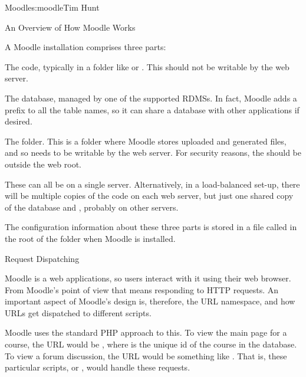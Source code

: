 \begin{aosachapter}{Moodle}{s:moodle}{Tim Hunt}
\begin{aosasect1}{An Overview of How Moodle Works}

A Moodle installation comprises three parts:

\begin{aosaenumerate}

\item The code, typically in a folder like  or
  . This should not be writable
  by the web server.

\item The database, managed by one of the supported RDMSs. In fact,
  Moodle adds a prefix to all the table names, so it can share a
  database with other applications if desired.

\item The  folder. This is a folder where Moodle
  stores uploaded and generated files, and so needs to be writable by
  the web server. For security reasons, the should be outside the web
  root.

\end{aosaenumerate}

These can all be on a single server. Alternatively, in a load-balanced
set-up, there will be multiple copies of the code on each web server,
but just one shared copy of the database and , probably on
other servers.

The configuration information about these three parts is stored in a
file called  in the root of the  folder when
Moodle is installed.

\begin{aosasect2}{Request Dispatching}

Moodle is a web applications, so users interact with it using their
web browser. From Moodle's point of view that means responding to HTTP
requests. An important aspect of Moodle's design is, therefore, the
URL namespace, and how URLs get dispatched to different scripts.

Moodle uses the standard PHP approach to this. To view the main page
for a course, \linebreak
the URL would be ,
where  is the unique id of the course \linebreak
in the database. To
view a forum discussion, the URL would be something like
\linebreak 
{}. That is, these particular
scripts,  or , would
handle these requests. 


\end{aosasect2}
\end{aosasect1}
\end{aosachapter}
